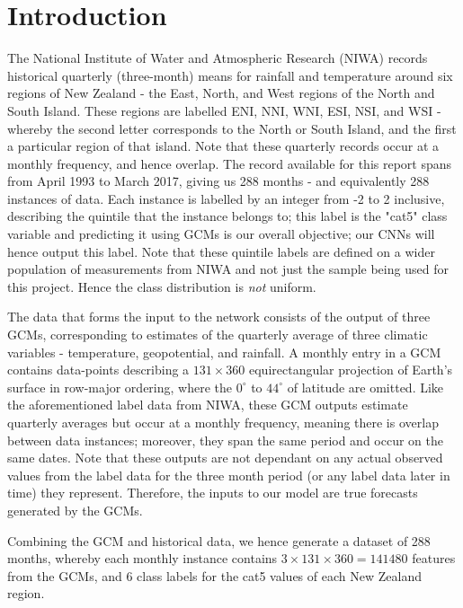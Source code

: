 \documentclass[11pt,a4paper, titlepage]{article}
\begin{document}
\section{Introduction}
The National Institute of Water and Atmospheric Research (NIWA) records historical quarterly (three-month) means for rainfall and temperature around six regions of New Zealand - the East, North, and West regions of the North and South Island. These regions are labelled ENI, NNI, WNI, ESI, NSI, and WSI - whereby the second letter corresponds to the North or South Island, and the first a particular region of that island. Note that these quarterly records occur at a monthly frequency, and hence overlap. The record available for this report spans from April 1993 to March 2017, giving us 288 months - and equivalently 288 instances of data. Each instance is labelled by an integer from -2 to 2 inclusive, describing the quintile that the instance belongs to; this label is the "cat5" class variable and predicting it using GCMs is our overall objective; our CNNs will hence output this label. Note that these quintile labels are defined on a wider population of measurements from NIWA and not just the sample being used for this project. Hence the class distribution is \emph{not} uniform.

\smallskip

The data that forms the input to the network consists of the output of three GCMs, corresponding to estimates of the quarterly average of three climatic variables - temperature, geopotential, and rainfall. A monthly entry in a GCM contains data-points describing a $131 \times 360$ equirectangular projection of Earth's surface in row-major ordering, where the $0^{\circ}$ to $44^{\circ}$ of latitude are omitted. Like the aforementioned label data from NIWA, these GCM outputs estimate quarterly averages but occur at a monthly frequency, meaning there is overlap between data instances; moreover, they span the same period and occur on the same dates. Note that these outputs are not dependant on any actual observed values from the label data for the three month period (or any label data later in time) they represent. Therefore, the inputs to our model are true forecasts generated by the GCMs.
\smallskip

Combining the GCM and historical data, we hence generate a dataset of 288 months, whereby each monthly instance contains $3 \times 131 \times 360 = 141480$ features from the GCMs, and 6 class labels for the cat5 values of each New Zealand region.
\end{document}
